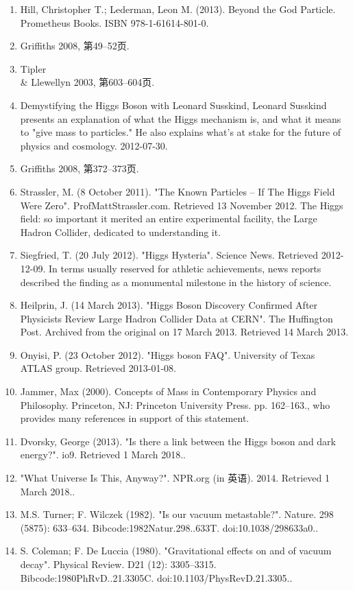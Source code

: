 \begin{enumerate}
    \item Hill, Christopher T.; Lederman, Leon M. (2013). Beyond the God Particle. Prometheus Books. ISBN 978-1-61614-801-0.
    \item Griffiths 2008, 第49–52页.
    \item Tipler \\& Llewellyn 2003, 第603–604页.
    \item Demystifying the Higgs Boson with Leonard Susskind, Leonard Susskind presents an explanation of what the Higgs mechanism is, and what it means to "give mass to particles." He also explains what's at stake for the future of physics and cosmology. 2012-07-30.
    \item Griffiths 2008, 第372–373页.
    \item Strassler, M. (8 October 2011). "The Known Particles – If The Higgs Field Were Zero". ProfMattStrassler.com. Retrieved 13 November 2012. The Higgs field: so important it merited an entire experimental facility, the Large Hadron Collider, dedicated to understanding it.
    \item Siegfried, T. (20 July 2012). "Higgs Hysteria". Science News. Retrieved 2012-12-09. In terms usually reserved for athletic achievements, news reports described the finding as a monumental milestone in the history of science.
    \item Heilprin, J. (14 March 2013). "Higgs Boson Discovery Confirmed After Physicists Review Large Hadron Collider Data at CERN". The Huffington Post. Archived from the original on 17 March 2013. Retrieved 14 March 2013.
    \item Onyisi, P. (23 October 2012). "Higgs boson FAQ". University of Texas ATLAS group. Retrieved 2013-01-08.
    \item Jammer, Max (2000). Concepts of Mass in Contemporary Physics and Philosophy. Princeton, NJ: Princeton University Press. pp. 162–163., who provides many references in support of this statement.
    \item Dvorsky, George (2013). "Is there a link between the Higgs boson and dark energy?". io9. Retrieved 1 March 2018..
    \item "What Universe Is This, Anyway?". NPR.org (in 英语). 2014. Retrieved 1 March 2018..
    \item M.S. Turner; F. Wilczek (1982). "Is our vacuum metastable?". Nature. 298 (5875): 633–634. Bibcode:1982Natur.298..633T. doi:10.1038/298633a0..
    \item S. Coleman; F. De Luccia (1980). "Gravitational effects on and of vacuum decay". Physical Review. D21 (12): 3305–3315. Bibcode:1980PhRvD..21.3305C. doi:10.1103/PhysRevD.21.3305..

\end{enumerate}
